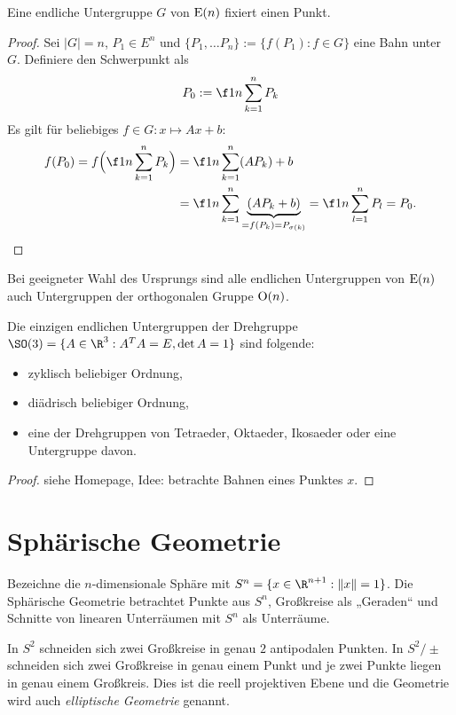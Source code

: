 \begin{lem}
	Eine endliche Untergruppe $G$ von $\operatorname{E}(n)$ fixiert einen Punkt.
	\begin{proof}
		Sei $|G| = n$, $P_1 \in E^n$ und $\{P_1, \dotsc P_n\} := \{f(P_1) : f \in G\}$ eine Bahn unter $G$.
		Definiere den Schwerpunkt als
		\[
			P_0 := \f 1n \sum_{k=1}^n P_k
		\]
		Es gilt für beliebiges $f \in G : x \mapsto Ax + b$:
		\begin{align*}
			f(P_0)
			= f\Big(\f 1n \sum_{k=1}^n P_k\Big)
			&= \f 1n \sum_{k=1}^n (AP_k) + b \\
			&= \f 1n \sum_{k=1}^n \underbrace{(AP_k + b)}_{=f(P_k) = P_{\sigma(k)}}
			= \f 1n \sum_{l=1}^n P_l
			= P_0.
		\end{align*}
	\end{proof}
\end{lem}

\begin{kor}
	Bei geeigneter Wahl des Ursprungs sind alle endlichen Untergruppen von $\operatorname{E}(n)$ auch Untergruppen der orthogonalen Gruppe $\operatorname{O}(n)$.
\end{kor}

\begin{st}
	Die einzigen endlichen Untergruppen der Drehgruppe $\SO (3) = \{ A \in \R^3 : A^TA = E, \det A = 1 \}$ sind folgende:
	\begin{itemize}
		\item
			zyklisch beliebiger Ordnung,
		\item
			diädrisch beliebiger Ordnung,
		\item
			eine der Drehgruppen von Tetraeder, Oktaeder, Ikosaeder oder eine Untergruppe davon.
	\end{itemize}
	\begin{proof}
		siehe Homepage, Idee: betrachte Bahnen eines Punktes $x$.
	\end{proof}
\end{st}


\section{Sphärische Geometrie}


Bezeichne die $n$-dimensionale Sphäre mit $S^n = \{ x \in \R^{n+1} : \|x\| = 1 \}$.
Die Sphärische Geometrie betrachtet Punkte aus $S^n$, Großkreise als „Geraden“ und Schnitte von linearen Unterräumen mit $S^n$ als Unterräume.

In $S^2$ schneiden sich zwei Großkreise in genau $2$ antipodalen Punkten.
In $S^2 / \pm$ schneiden sich zwei Großkreise in genau einem Punkt und je zwei Punkte liegen in genau einem Großkreis.
Dies ist die reell projektiven Ebene und die Geometrie wird auch \emph{elliptische Geometrie} genannt.


